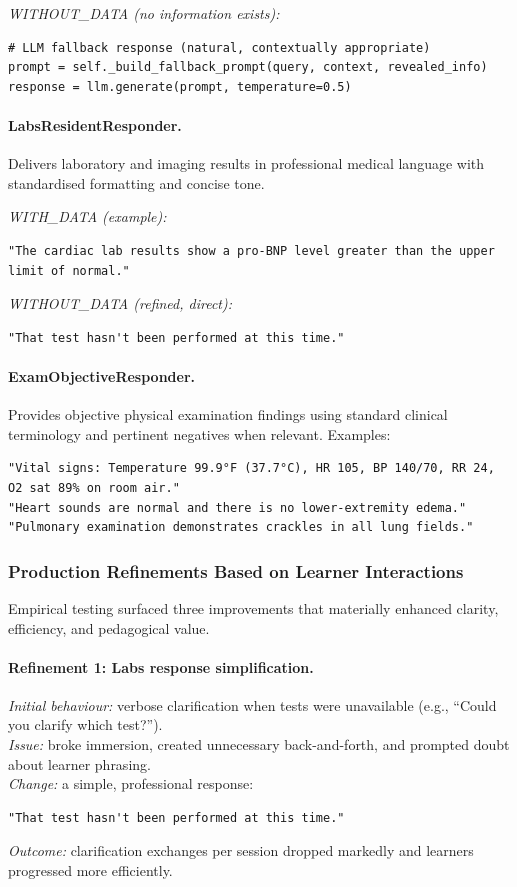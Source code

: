 \noindent\textit{WITHOUT\_DATA (no information exists):}
\begin{verbatim}
# LLM fallback response (natural, contextually appropriate)
prompt = self._build_fallback_prompt(query, context, revealed_info)
response = llm.generate(prompt, temperature=0.5)
\end{verbatim}

\paragraph{LabsResidentResponder.}
Delivers laboratory and imaging results in professional medical language with
standardised formatting and concise tone.

\noindent\textit{WITH\_DATA (example):}
\begin{verbatim}
"The cardiac lab results show a pro-BNP level greater than the upper limit of normal."
\end{verbatim}

\noindent\textit{WITHOUT\_DATA (refined, direct):}
\begin{verbatim}
"That test hasn't been performed at this time."
\end{verbatim}

\paragraph{ExamObjectiveResponder.}
Provides objective physical examination findings using standard clinical
terminology and pertinent negatives when relevant. Examples:
\begin{verbatim}
"Vital signs: Temperature 99.9°F (37.7°C), HR 105, BP 140/70, RR 24, O2 sat 89% on room air."
"Heart sounds are normal and there is no lower-extremity edema."
"Pulmonary examination demonstrates crackles in all lung fields."
\end{verbatim}

\subsubsection{Production Refinements Based on Learner Interactions}
\label{sec:production_refinements}

Empirical testing surfaced three improvements that materially enhanced clarity,
efficiency, and pedagogical value.

\paragraph{Refinement 1: Labs response simplification.}
\emph{Initial behaviour:} verbose clarification when tests were unavailable
(e.g., ``Could you clarify which test?''). \\
\emph{Issue:} broke immersion, created unnecessary back-and-forth, and
prompted doubt about learner phrasing. \\
\emph{Change:} a simple, professional response:
\begin{verbatim}
"That test hasn't been performed at this time."
\end{verbatim}
\emph{Outcome:} clarification exchanges per session dropped markedly and
learners progressed more efficiently.

